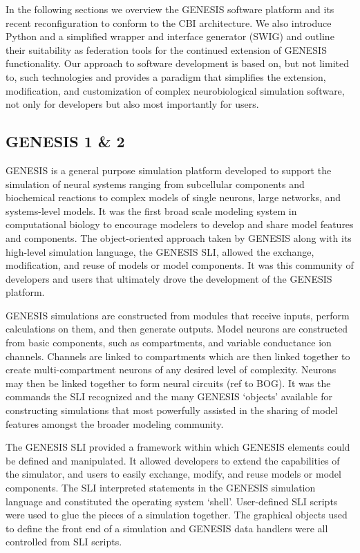 \documentclass[10pt]{article}
\begin{document}
In the following sections we overview the GENESIS software platform and its recent reconfiguration to conform to the CBI architecture. We also introduce Python and a simplified wrapper and interface generator (SWIG) and outline their suitability as federation tools for the continued extension of GENESIS functionality. Our approach to software development is based on, but not limited to, such technologies and provides a paradigm that simplifies the extension, modification, and customization of complex neurobiological simulation software, not only for developers but also most importantly for users.

\subsection*{GENESIS 1 \& 2}

GENESIS is a general purpose
simulation platform developed to support the simulation of
neural systems ranging from subcellular components and biochemical
reactions to complex models of single neurons, large
networks, and systems-level models. It was the first broad scale
modeling system in computational biology to encourage modelers to
develop and share model features and components.
The object-oriented approach taken by GENESIS along with its
high-level simulation language, the GENESIS SLI, allowed the exchange,
modification, and reuse of models or model components. It was this
community of developers and users that ultimately drove the
development of the GENESIS platform.

GENESIS simulations are constructed from modules that receive inputs,
perform calculations on them, and then generate outputs. Model neurons
are constructed from basic components, such as compartments, and
variable conductance ion channels. Channels are linked to compartments which are then linked together to create multi-compartment
neurons of any desired level of complexity. Neurons may then be linked
together to form neural circuits (ref to BOG).  
It was the commands the SLI recognized and the many GENESIS
`objects' available for constructing simulations that
most powerfully assisted in the sharing of model features amongst the
broader modeling community.

The GENESIS SLI  provided a
framework within which GENESIS elements could be defined and
manipulated. It allowed developers to extend the
capabilities of the simulator, and users to easily exchange, modify, and reuse
models or model components. The SLI interpreted statements in the
GENESIS simulation language and constituted the operating system
`shell'. User-defined SLI scripts were used to glue the pieces of a
simulation together. The graphical objects used to define the front
end of a simulation and GENESIS data handlers were all controlled from
SLI scripts.
\end{document}
